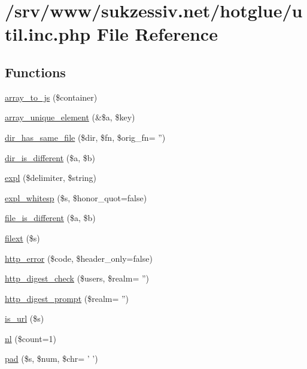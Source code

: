 \hypertarget{util_8inc_8php}{
\section{/srv/www/sukzessiv.net/hotglue/util.inc.php File Reference}
\label{util_8inc_8php}
}
\subsection*{Functions}
\begin{DoxyCompactItemize}
\item 
\hyperlink{util_8inc_8php_a61d3b2881d9368741c71509017724bc8}{array\_\-to\_\-js} (\$container)
\item 
\hyperlink{util_8inc_8php_a4647462c98447c6c2842f70d8c313f85}{array\_\-unique\_\-element} (\&\$a, \$key)
\item 
\hyperlink{util_8inc_8php_a7f3e06b0a6f405290cb4d7990b8ac5c6}{dir\_\-has\_\-same\_\-file} (\$dir, \$fn, \$orig\_\-fn= '')
\item 
\hyperlink{util_8inc_8php_a6309f576f2611237288d0dd3eed09db3}{dir\_\-is\_\-different} (\$a, \$b)
\item 
\hyperlink{util_8inc_8php_aafce787d4b725ac62be6306ff3e352e7}{expl} (\$delimiter, \$string)
\item 
\hyperlink{util_8inc_8php_a1d2500a5e237e59956b03cbea845c95a}{expl\_\-whitesp} (\$s, \$honor\_\-quot=false)
\item 
\hyperlink{util_8inc_8php_a9c9a81ec9dba8b2870cbb365f8139866}{file\_\-is\_\-different} (\$a, \$b)
\item 
\hyperlink{util_8inc_8php_a6d9392e51344c2e8720a0c1982ebea21}{filext} (\$s)
\item 
\hyperlink{util_8inc_8php_ae51039516309f10d5be73220f351e808}{http\_\-error} (\$code, \$header\_\-only=false)
\item 
\hyperlink{util_8inc_8php_aff065fbc9f3abbf9c5a0ebfba22acbf7}{http\_\-digest\_\-check} (\$users, \$realm= '')
\item 
\hyperlink{util_8inc_8php_a95d221746e2d296434b0d63f78cedf57}{http\_\-digest\_\-prompt} (\$realm= '')
\item 
\hyperlink{util_8inc_8php_a0da48011cb68c039aec396c23cb04295}{is\_\-url} (\$s)
\item 
\hyperlink{util_8inc_8php_a9f9eeab2eb9a39518e80609fc7f83842}{nl} (\$count=1)
\item 
\hyperlink{util_8inc_8php_a37ef346387afe0af2cf86a8bea887173}{pad} (\$s, \$num, \$chr= ' ')

\end{DoxyCompactItemize}
